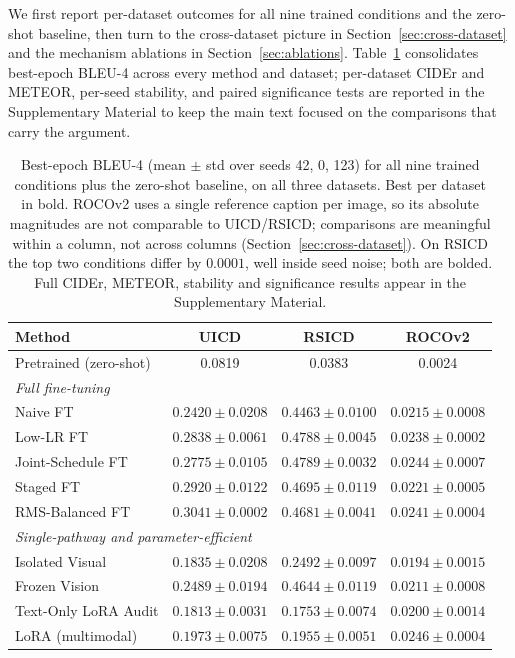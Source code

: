 \documentclass[journal]{IEEEtran}
\begin{document}
We first report per-dataset outcomes for all nine trained
conditions and the zero-shot baseline,
then turn to the cross-dataset picture in
Section~\ref{sec:cross-dataset} and the mechanism ablations in
Section~\ref{sec:ablations}. Table~\ref{tab:main-results}
consolidates best-epoch BLEU-4 across every method and dataset;
per-dataset CIDEr and METEOR, per-seed stability, and paired
significance tests are reported in the Supplementary Material to keep the main text focused on the comparisons that carry the argument.

\begin{table}[!htbp]
\centering
\caption{Best-epoch BLEU-4 (mean $\pm$ std over seeds 42, 0, 123)
for all nine trained conditions plus the zero-shot baseline, on
all three datasets. Best per dataset
in bold. ROCOv2 uses a single reference caption per image, so its
absolute magnitudes are not comparable to UICD/RSICD; comparisons
are meaningful within a column, not across columns
(Section~\ref{sec:cross-dataset}). On RSICD the top two conditions
differ by $0.0001$, well inside seed noise; both are bolded. Full
CIDEr, METEOR, stability and significance results appear in the
Supplementary Material.}
\label{tab:main-results}
\begin{tabular}{lccc}
\toprule
\textbf{Method} & \textbf{UICD} & \textbf{RSICD} & \textbf{ROCOv2} \\
\midrule
Pretrained (zero-shot) & 0.0819 & 0.0383 & 0.0024 \\
\midrule
\multicolumn{4}{l}{\emph{Full fine-tuning}} \\
Naive FT            & $0.2420 \pm 0.0208$ & $0.4463 \pm 0.0100$ & $0.0215 \pm 0.0008$ \\
Low-LR FT           & $0.2838 \pm 0.0061$ & $\mathbf{0.4788 \pm 0.0045}$ & $0.0238 \pm 0.0002$ \\
Joint-Schedule FT   & $0.2775 \pm 0.0105$ & $\mathbf{0.4789 \pm 0.0032}$ & $0.0244 \pm 0.0007$ \\
Staged FT           & $0.2920 \pm 0.0122$ & $0.4695 \pm 0.0119$ & $0.0221 \pm 0.0005$ \\
RMS-Balanced FT     & $\mathbf{0.3041 \pm 0.0002}$ & $0.4681 \pm 0.0041$ & $0.0241 \pm 0.0004$ \\
\midrule
\multicolumn{4}{l}{\emph{Single-pathway and parameter-efficient}} \\
Isolated Visual     & $0.1835 \pm 0.0208$ & $0.2492 \pm 0.0097$ & $0.0194 \pm 0.0015$ \\
Frozen Vision       & $0.2489 \pm 0.0194$ & $0.4644 \pm 0.0119$ & $0.0211 \pm 0.0008$ \\
Text-Only LoRA Audit    & $0.1813 \pm 0.0031$ & $0.1753 \pm 0.0074$ & $0.0200 \pm 0.0014$ \\
LoRA (multimodal)   & $0.1973 \pm 0.0075$ & $0.1955 \pm 0.0051$ & $\mathbf{0.0246 \pm 0.0004}$ \\
\bottomrule
\end{tabular}
\end{table}
\end{document}

